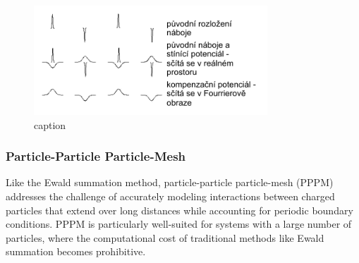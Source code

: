 \begin{figure}[htb!]
	\centering
	\includegraphics[width=1.0\linewidth]{img/ewald.png} 
	\caption{caption}
	\label{fig:ewald}    
\end{figure} 
\subsubsection{Particle-Particle Particle-Mesh}
Like the Ewald summation method, particle-particle particle-mesh (PPPM) addresses the challenge of accurately modeling interactions between charged particles that extend over long distances while accounting for periodic boundary conditions. PPPM is particularly well-suited for systems with a large number of particles, where the computational cost of traditional methods like Ewald summation becomes prohibitive.


